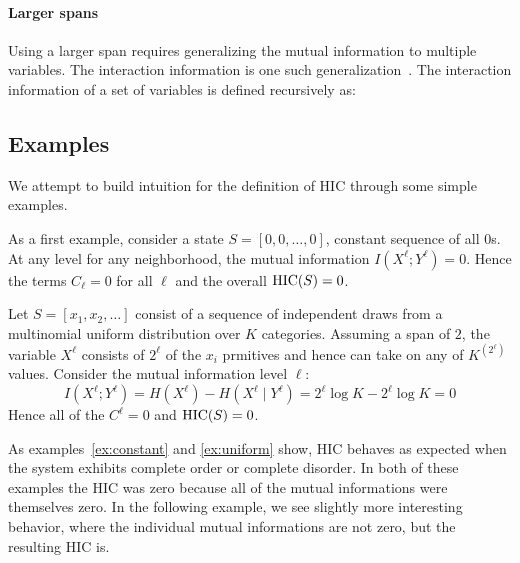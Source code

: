 \paragraph{Larger spans} Using a larger span requires generalizing the mutual
information to multiple variables. The interaction information is one such
generalization~\citep{mcgill1954multivariate}. The interaction information of a
set of variables is defined recursively as:

\subsection{Examples}

We attempt to build intuition for the definition of HIC through some simple
examples.

\begin{example}
  \label{ex:constant}
  As a first example, consider a state $S = [0, 0, \ldots, 0]$,
  constant sequence of all $0$s. At any level for any neighborhood, the mutual
  information $I(X^\ell; Y^\ell) = 0$. Hence the terms $C_\ell = 0$ for all
  $\ell$ and the overall $\textup{HIC}(S) = 0$.
\end{example}

\begin{example}
  \label{ex:uniform}
  Let $S = [x_1, x_2, \ldots]$ consist of a sequence of independent draws from a
  multinomial uniform distribution over $K$ categories. Assuming a span of $2$,
  the variable $X^\ell$ consists of $2^\ell$ of the $x_i$ prmitives and hence
  can take on any of $K^(2^\ell)$ values. Consider the mutual information level
  $\ell$:
  \begin{equation}
    I(X^\ell; Y^\ell) = H(X^\ell) - H(X^\ell \mid Y^{\ell}) = 2^\ell \log K - 2^\ell \log K = 0
  \end{equation}
  Hence all of the $C^\ell = 0$ and $\textup{HIC}(S) = 0$.
\end{example}

As examples~\ref{ex:constant} and \ref{ex:uniform} show, HIC behaves as
expected when the system exhibits complete order or complete disorder. In both
of these examples the HIC was zero because all of the mutual informations were
themselves zero. In the following example, we see slightly more interesting
behavior, where the individual mutual informations are not zero, but the
resulting HIC is.

